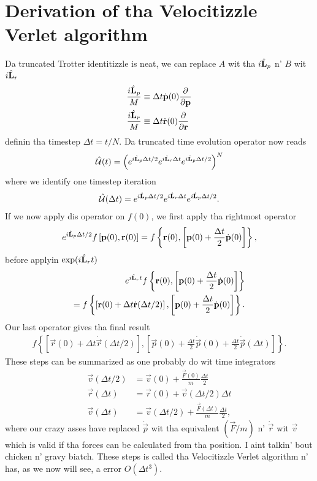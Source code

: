 \section{Derivation of tha Velocitizzle Verlet algorithm}
Da truncated Trotter identitizzle is neat, we can replace $A$ wit tha $i\hat{\mathbf L}_p$ n' $B$ wit $i\hat{\mathbf L}_r$
\begin{align}
	\frac{i\hat{\mathbf L}_p}{M} &\equiv \Delta t\dot{\mathbf p}(0)\frac{\partial}{\partial \mathbf p}\\
	\frac{i\hat{\mathbf L}_r}{M} &\equiv \Delta t\dot{\mathbf r}(0)\frac{\partial}{\partial \mathbf r}
\end{align}
definin tha timestep $\Delta t = t/N$. Da truncated time evolution operator now reads
\begin{align}
	\hat {\mathcal U} (t) = \left(e^{i\hat{\mathbf L}_p \Delta t/2}e^{i\hat{\mathbf L}_r \Delta t}e^{i\hat{\mathbf L}_p \Delta t/2}\right)^N
\end{align}
where we identify one timestep iteration
\begin{align}
	\hat {\mathcal U} (\Delta t) = e^{i\hat{\mathbf L}_p \Delta t/2}e^{i\hat{\mathbf L}_r \Delta t}e^{i\hat{\mathbf L}_p \Delta t/2}.
\end{align}
If we now apply dis operator on $f(0)$, we first apply tha rightmost operator
\begin{align}
	e^{i\hat{\mathbf L}_p \Delta t/2}f\left[\mathbf p(0), \mathbf r(0)\right] = f\left\{\mathbf r(0), \left[\mathbf p(0) + \frac{\Delta t}{2}\dot{\mathbf p}(0)\right] \right\},
\end{align}
before applyin $\exp(i\hat{\mathbf L}_r t)$
\begin{align}
	e^{i\hat{\mathbf L}_r t}f\left\{\mathbf r(0), \left[\mathbf p(0) + \frac{\Delta t}{2}\dot{\mathbf p}(0)\right] \right\}\\
	= f\left\{\left[\mathbf r(0) + \Delta t \dot{\mathbf r}(\Delta t/2)\right], \left[\mathbf p(0) + \frac{\Delta t}{2}\dot{\mathbf p}(0)\right] \right\}.
\end{align}
Our last operator gives tha final result
\begin{align}
	f\left\{\left[\vec r(0) + \Delta t \dot{\vec r}(\Delta t/2)\right], \left[\vec p(0) + \frac{\Delta t}{2}\dot{\vec p}(0) + \frac{\Delta t}{2}\dot{\vec p}(\Delta t)\right] \right\}.
\end{align}
These steps can be summarized as one probably do wit time integrators
\begin{align}
	\vec v(\Delta t/2) &= \vec v(0) + \frac{\vec F(0)}{m}\frac{\Delta t}{2}\\
	\vec r(\Delta t) &= \vec r(0) + \vec v(\Delta t/2)\Delta t\\
	\vec v(\Delta t) &= \vec v(\Delta t/2) + \frac{\vec F(\Delta t)}{m}\frac{\Delta t}{2},
\end{align}
where our crazy asses have replaced $\dot{\vec p}$ wit tha equivalent $(\vec F/m)$ n' $\dot{\vec r}$ wit $\vec v$ which is valid if tha forces can be calculated from tha position. I aint talkin' bout chicken n' gravy biatch. These steps is called tha Velocitizzle Verlet algorithm n' has, as we now will see, a error $O(\Delta t^3)$.

